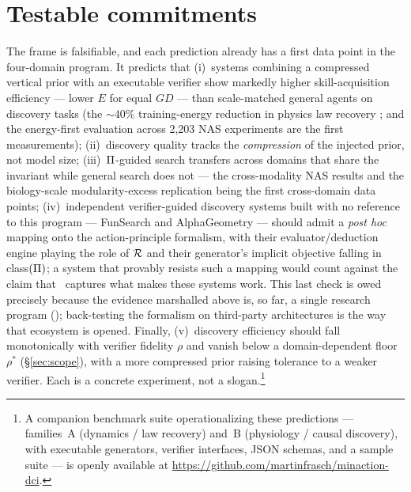 \section{Testable commitments}
\label{sec:testable}

The frame is falsifiable, and each prediction already has a first data point in the four-domain program. It predicts that (i)~systems combining a compressed vertical prior with an executable verifier show markedly higher skill-acquisition efficiency --- lower $E$ for equal $GD$ --- than scale-matched general agents on discovery tasks (the ${\sim}40\%$ training-energy reduction in physics law recovery \citep{frasch2026b}; and the energy-first evaluation across 2{,}203 NAS experiments \citep{frasch2026c} are the first measurements); (ii)~discovery quality tracks the \emph{compression} of the injected prior, not model size; (iii)~$\Pi$-guided search transfers across domains that share the invariant while general search does not --- the cross-modality NAS results \citep{frasch2026c} and the biology-scale modularity-excess replication \citep{frasch2026d} being the first cross-domain data points; (iv)~independent verifier-guided discovery systems built with no reference to this program --- FunSearch \citep{romera2024} and AlphaGeometry \citep{trinh2024} --- should admit a \emph{post hoc} mapping onto the action-principle formalism, with their evaluator/deduction engine playing the role of $\mathcal{R}$ and their generator's implicit objective falling in class$(\Pi)$; a system that provably resists such a mapping would count against the claim that \NWAP\ captures what makes these systems work. This last check is owed precisely because the evidence marshalled above is, so far, a single research program (\citealp{frasch2026a,frasch2026b,frasch2026c,frasch2026d}); back-testing the formalism on third-party architectures is the way that ecosystem is opened. Finally, (v)~discovery efficiency should fall monotonically with verifier fidelity $\rho$ and vanish below a domain-dependent floor $\rho^\ast$ (\S\ref{sec:scope}), with a more compressed prior raising tolerance to a weaker verifier. Each is a concrete experiment, not a slogan.\footnote{A companion benchmark suite operationalizing these predictions --- families~A (dynamics / law recovery) and~B (physiology / causal discovery), with executable generators, verifier interfaces, JSON schemas, and a sample suite --- is openly available at \url{https://github.com/martinfrasch/minaction-dci}.}
